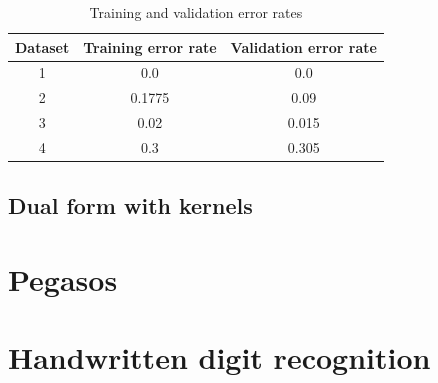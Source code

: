 \documentclass{article}
\begin{document}
\begin{table}
  \begin{center}
    \begin{tabular}{ | c | c | c | }
      \hline
      Dataset & Training error rate & Validation error rate \\ \hline
      1       & 0.0                 & 0.0                   \\ \hline
      2       & 0.1775              & 0.09                  \\ \hline
      3       & 0.02                & 0.015                 \\ \hline
      4       & 0.3                 & 0.305                 \\ \hline
    \end{tabular}
  \end{center}
  \caption{Training and validation error rates}
\end{table}


\subsection{Dual form with kernels}


\section{Pegasos}

\section{Handwritten digit recognition}
\end{document}
